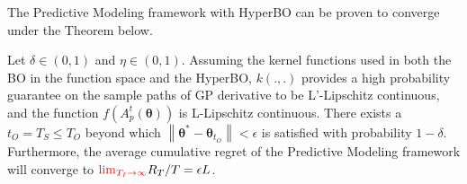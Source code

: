 The Predictive Modeling framework with HyperBO can be proven to converge under the Theorem below.

\begin{theorem}
	Let $\delta \in (0,1)$ and $\eta \in (0,1)$. Assuming the kernel functions used in both the BO in the function space and the HyperBO, $k(.,.)$ provides a high probability guarantee on the sample paths of GP derivative to be L'-Lipschitz continuous, and the function $f(A^{t}_{p}(\boldsymbol{\theta}))$ is L-Lipschitz continuous. There exists a $t_O = T_{S} \leq T_{O}$ beyond which $\left\|\boldsymbol{\theta}^{*}-\boldsymbol{\theta}_{t_{O}}\right\| < \epsilon$ is satisfied with probability $1-\delta$. Furthermore, the average cumulative regret of the Predictive Modeling framework will converge to $\textcolor{red}{\lim_{T_{I} \rightarrow \infty}} R_{T}/T = \epsilon L$.
\end{theorem}

